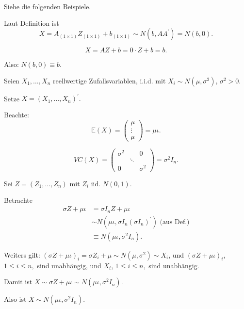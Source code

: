 \documentclass{tstextbook}
\begin{document}
Siehe die folgenden Beispiele.

\begin{example}[ $Z\sim N(0,1)$, $A=0$, $b\in\mathbb{R}.$]
  
  
  Laut Definition ist \[X=A_{(1\times1)}Z_{(1\times1)}+b_{(1\times1)}\sim N\left(b,AA^{\prime}\right)=N(b,0).\]
  
  \[
  X=AZ+b=0\cdot Z+b=b.
  \]
  
  Also: $N(b,0)\equiv b.$
  

\end{example}

\begin{example}
	
	Seien $X_{1},\ldots,X_{n}$ reellwertige Zufallsvariablen, i.i.d. mit
	$X_{i}\sim N\left(\mu,\sigma^{2}\right),\,\sigma^{2}>0.$
	
	Setze $X=\left(X_{1},\ldots,X_{n}\right)^{\prime}.$ 
	
	Beachte: 
	\[
	\mathbb{E}(X)=\begin{pmatrix}\mu\\
		\vdots\\
		\mu
	\end{pmatrix}=\mu\iota.
	\]
	
	\[
	VC(X)=\begin{pmatrix}\sigma^{2} &  & 0\\
		& \ddots\\
		0 &  & \sigma^{2}
	\end{pmatrix}=\sigma^{2}I_{n}.
	\]
	
	
	Sei $Z=\left(Z_{1},\ldots,Z_{n}\right)$ mit $Z_{i}$ iid. $N(0,1).$
	
	Betrachte
	\begin{align*}
		\sigma Z+\mu\iota & =\sigma I_{n}Z+\mu\iota\\
		& \sim N\left(\mu\iota,\sigma I_{n}\left(\sigma I_{n}\right)^{\prime}\right)\text{ (aus Def.)}\\
		& \equiv N\left(\mu\iota,\sigma^{2}I_{n}\right).
	\end{align*}
	
	Weiters gilt: $(\sigma Z+\mu\iota)_{i}=\sigma Z_{i}+\mu\sim N\left(\mu,\sigma^{2}\right)\sim X_{i}$, und $(\sigma Z+\mu\iota)_{i}$, $1\le i\le n,$ sind unabhängig, und $X_{i}$, $1\le i\le n,$ sind unabhängig.
	
	Damit ist $X\sim\sigma Z+\mu\iota\sim N\left(\mu\iota,\sigma^{2}I_{n}\right).$
	
	Also ist $X\sim N\left(\mu\iota,\sigma^{2}I_{n}\right).$
	

\end{example}
\end{document}

